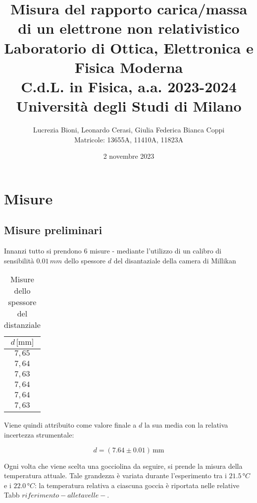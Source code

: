 \documentclass[]{article}
\title{%
    \Huge Misura del rapporto carica/massa di un elettrone non relativistico \\
    \Large Laboratorio di Ottica, Elettronica e Fisica Moderna \\ C.d.L. in Fisica, a.a. 2023-2024 \\ Università degli Studi di Milano}
\author{\LARGE Lucrezia Bioni, Leonardo Cerasi, Giulia Federica Bianca Coppi \\ Matricole: 13655A, 11410A, 11823A}
\date{2 novembre 2023}
\let\oldsection\section%
\renewcommand{\section}{%
	\renewcommand{\theequation}{\thesection.\arabic{equation}}%
	\oldsection}%
\let\oldsubsection\subsection%
\renewcommand{\subsection}{%
	\renewcommand{\theequation}{\thesubsection.\arabic{equation}}%
	\oldsubsection}%
\begin{document}
    \maketitle

    \section{Misure}

    \subsection{Misure preliminari}

    Innanzi tutto si prendono 6 misure - mediante l'utilizzo di un calibro di sensibilità $ 0.01\, mm $ dello spessore $ d $ del disantaziale della camera di Millikan

    \begin{table}[H]
        \centering
    
        \begin{tabular}{||c||}
            \hline
            $d\, \text{[mm]} $ \\
            \hline\hline
    
            $ 7,65 $ \\\hline
            $ 7,64 $ \\\hline
            $ 7,63 $ \\\hline
            $ 7,64 $ \\\hline
            $ 7,64 $ \\\hline
            $ 7,63 $ \\\hline

        
        \end{tabular}
        \caption{Misure dello spessore del distanziale}
        \label{distanziale}
    \end{table}

    Viene quindi attribuito come valore finale a $ d $ la sua media con la relativa incertezza strumentale:

    \begin{equation}
        \label{misura_Rb}
        d = (7.64 \pm 0.01) \, \text{mm}
    \end{equation} 

    Ogni volta che viene scelta una gocciolina da seguire, si prende la misura della temperatura attuale. Tale grandezza è variata durante l'esperimento tra i $ 21.5\, °C $ e i $ 22.0\, °C $: la temperatura relativa a ciascuna goccia è riportata nelle relative Tabb $ riferimento - alle tavelle-$.
\end{document}
